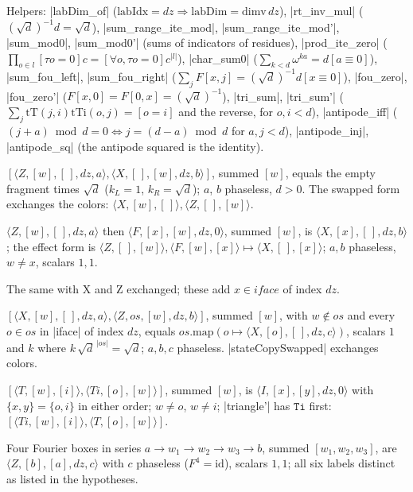 Helpers: \lean|labDim_of| ($\mathrm{labIdx}=dz\Rightarrow\mathrm{labDim}=\mathrm{dimv}\,dz$),
\lean|rt_inv_mul| ($(\sqrt d)^{-1}d=\sqrt d$), \lean|sum_range_ite_mod|, \lean|sum_range_ite_mod'|,
\lean|sum_mod0|, \lean|sum_mod0'| (sums of indicators of residues), \lean|prod_ite_zero|
($\prod_{o\in l}[\tau o=0]c=[\forall o, \tau o=0]c^{|l|}$), \lean|char_sum0|
($\sum_{k<d}\omega^{ka}=d[a\equiv0]$), \lean|sum_fou_left|, \lean|sum_fou_right|
($\sum_jF[x,j]=(\sqrt d)^{-1}d[x\equiv0]$), \lean|fou_zero|, \lean|fou_zero'| ($F[x,0]=F[0,x]=(\sqrt
d)^{-1}$), \lean|tri_sum|, \lean|tri_sum'| ($\sum_j\mathrm{tT}(j,i)\mathrm{tTi}(o,j)=[o=i]$ and the
reverse, for $o,i<d$), \lean|antipode_iff| ($(j+a)\bmod d=0\iff j=(d-a)\bmod d$ for $a,j<d$),
\lean|antipode_inj|, \lean|antipode_sq| (the antipode squared is the identity).

\begin{description}[style=nextline,font=\normalfont\ttfamily]
\item[cap, capSwapped] $[\langle Z,[w],[\,],dz,a\rangle,\langle X,[\,],[w],dz,b\rangle]$, summed $[w]$,
  equals the empty fragment times $\sqrt d$ ($k_L=1$, $k_R=\sqrt d$); $a$, $b$ phaseless, $d>0$. The
  swapped form exchanges the colors: $\langle X,[w],[\,]\rangle,\langle Z,[\,],[w]\rangle$.
\item[colorState, colorEffect] $\langle Z,[w],[\,],dz,a\rangle$ then $\langle F,[x],[w],dz,0\rangle$,
  summed $[w]$, is $\langle X,[x],[\,],dz,b\rangle$; the effect form is
  $\langle Z,[\,],[w]\rangle,\langle F,[w],[x]\rangle\mapsto\langle X,[\,],[x]\rangle$; $a,b$ phaseless,
  $w\ne x$, scalars $1,1$.
\item[colorStateX, colorEffectX] The same with X and Z exchanged; these add $x\in\mathit{iface}$ of
  index $dz$.
\item[stateCopy] $[\langle X,[w],[\,],dz,a\rangle,\langle Z,os,[w],dz,b\rangle]$, summed $[w]$, with
  $w\notin os$ and every $o\in os$ in \lean|iface| of index $dz$, equals
  $os.\mathrm{map}(o\mapsto\langle X,[o],[\,],dz,c\rangle)$, scalars $1$ and $k$ where
  $k\,\sqrt d^{\,|os|}=\sqrt d$; $a,b,c$ phaseless. \lean|stateCopySwapped| exchanges colors.
\item[triangle, triangle'] $[\langle T,[w],[i]\rangle,\langle Ti,[o],[w]\rangle]$, summed $[w]$, is
  $\langle I,[x],[y],dz,0\rangle$ with $\{x,y\}=\{o,i\}$ in either order; $w\ne o$, $w\ne i$;
  \lean|triangle'| has $\mathtt{Ti}$ first: $[\langle Ti,[w],[i]\rangle,\langle T,[o],[w]\rangle]$.
\item[fourier4] Four Fourier boxes in series $a\to w_1\to w_2\to w_3\to b$, summed $[w_1,w_2,w_3]$,
  are $\langle Z,[b],[a],dz,c\rangle$ with $c$ phaseless ($F^4=\mathrm{id}$), scalars $1,1$; all six
  labels distinct as listed in the hypotheses.
\end{description}

